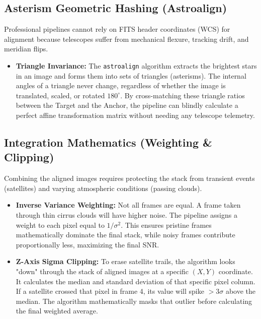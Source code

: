 \documentclass[11pt,a4paper]{article}
\begin{document}
\subsection{Asterism Geometric Hashing (Astroalign)}\label{app:astroalign}
Professional pipelines cannot rely on FITS header coordinates (WCS) for alignment because telescopes suffer from mechanical flexure, tracking drift, and meridian flips.
\begin{itemize}[leftmargin=*]
    \item \textbf{Triangle Invariance:} The \texttt{astroalign} algorithm extracts the brightest stars in an image and forms them into sets of triangles (asterisms). The internal angles of a triangle never change, regardless of whether the image is translated, scaled, or rotated $180^\circ$. By cross-matching these triangle ratios between the Target and the Anchor, the pipeline can blindly calculate a perfect affine transformation matrix without needing any telescope telemetry.
\end{itemize}

\subsection{Integration Mathematics (Weighting \& Clipping)}\label{app:stacking}
Combining the aligned images requires protecting the stack from transient events (satellites) and varying atmospheric conditions (passing clouds).
\begin{itemize}[leftmargin=*]
    \item \textbf{Inverse Variance Weighting:} Not all frames are equal. A frame taken through thin cirrus clouds will have higher noise. The pipeline assigns a weight to each pixel equal to $1/\sigma^2$. This ensures pristine frames mathematically dominate the final stack, while noisy frames contribute proportionally less, maximizing the final SNR.
    \item \textbf{Z-Axis Sigma Clipping:} To erase satellite trails, the algorithm looks "down" through the stack of aligned images at a specific $(X,Y)$ coordinate. It calculates the median and standard deviation of that specific pixel column. If a satellite crossed that pixel in frame 4, its value will spike $>3\sigma$ above the median. The algorithm mathematically masks that outlier before calculating the final weighted average.
\end{itemize}
\end{document}
